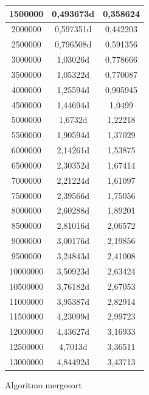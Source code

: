 \documentclass[12pt,spanish]{article}
\begin{document}
\begin{figure}[H]
\begin{tabular}{|c|c|c|}
\hline
1500000 & 0,493673d & 0,358624 \\
\hline
2000000 & 0,597351d & 0,442203 \\
\hline
2500000 & 0,796508d & 0,591356 \\
\hline
3000000 & 1,03026d & 0,778666 \\
\hline
3500000 & 1,05322d & 0,770087 \\
\hline
4000000 & 1,25594d & 0,905945 \\
\hline
4500000 & 1,44694d & 1,0499 \\
\hline
5000000 & 1,6732d & 1,22218 \\
\hline
5500000 & 1,90594d & 1,37029 \\
\hline
6000000 & 2,14261d & 1,53875 \\
\hline
6500000 & 2,30352d & 1,67414 \\
\hline
7000000 & 2,21224d & 1,61097 \\
\hline
7500000 & 2,39566d & 1,75056 \\
\hline
8000000 & 2,60288d & 1,89201 \\
\hline
8500000 & 2,81016d & 2,06572 \\
\hline
9000000 & 3,00176d & 2,19856 \\
\hline
9500000 & 3,24843d & 2,41008 \\
\hline
10000000 & 3,50923d & 2,63424 \\
\hline
10500000 & 3,76182d & 2,67053 \\
\hline
11000000 & 3,95387d & 2,82914 \\
\hline
11500000 & 4,23099d & 2,99723 \\
\hline
12000000 & 4,43627d & 3,16933 \\
\hline
12500000 & 4,7013d & 3,36511 \\
\hline
13000000 & 4,84492d & 3,43713 \\
\hline
\end{tabular}
\caption{Algoritmo mergesort}
\end{figure}
\end{document}
